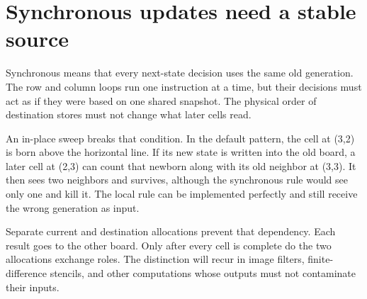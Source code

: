 \section{Synchronous updates need a stable
  source}\label{008-life-generations-p01-synchronous-updates-need-a-stable-source}

Synchronous means that every next-state decision uses the same old
generation. The row and column loops run one instruction at a time, but
their decisions must act as if they were based on one shared snapshot.
The physical order of destination stores must not change what later
cells read.

An in-place sweep breaks that condition. In the default pattern, the
cell at (3,2) is born above the horizontal line. If its new state is
written into the old board, a later cell at (2,3) can count that newborn
along with its old neighbor at (3,3). It then sees two neighbors and
survives, although the synchronous rule would see only one and kill it.
The local rule can be implemented perfectly and still receive the wrong
generation as input.

Separate current and destination allocations prevent that dependency.
Each result goes to the other board. Only after every cell is complete
do the two allocations exchange roles. The distinction will recur in
image filters, finite-difference stencils, and other computations whose
outputs must not contaminate their inputs.
